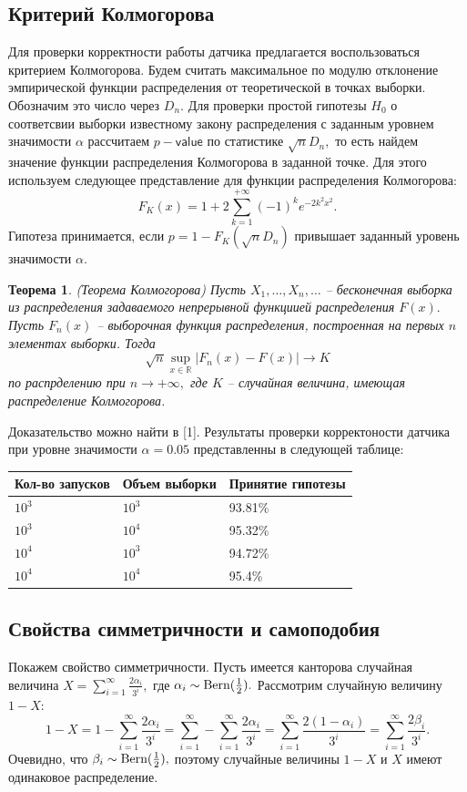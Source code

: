 \documentclass[11pt]{article}
\newtheorem{theorem}{Теорема}
\newcommand{\bern}{\normalfont{\text{Bern}}}
\numberwithin{equation}{section}
\begin{document}
\subsection{Критерий Колмогорова}
Для проверки корректности работы датчика предлагается воспользоваться критерием Колмогорова. Будем считать максимальное по модулю отклонение эмпирической функции распределения от теоретической в точках выборки. 
Обозначим это число через $D_n.$ Для проверки простой гипотезы $H_0$ о соответсвии выборки известному закону распределения с заданным уровнем значимости 
$\alpha$ рассчитаем $p-\textsf{value}$ по статистике $\sqrt{n}D_n,$ то есть найдем значение функции распределения Колмогорова в заданной точке.
Для этого используем следующее представление для функции распределения Колмогорова:
$$ F_K(x)=1+2\sum_{k=1}^{+\infty}(-1)^k e^{-2k^2x^2}.$$
Гипотеза принимается, если $p= 1 -F_K(\sqrt{n}D_n)$ привышает заданный уровень значимости $\alpha$.
\begin{theorem}
  (Теорема Колмогорова)
  Пусть $X_1, \dots, X_n, \dots $ -- бесконечная выборка из распределения задаваемого непрерывной функциией распределения $F(x).$
  Пусть $F_n(x)$ -- выборочная функция распределения, построенная на первых $n$ элементах выборки. Тогда 
  $$ \sqrt{n} \sup_{x\in \mathbb{R}}|F_n(x)-F(x)| \to K$$
  по распрделению при $n \to + \infty,$ где $K$ -- случайная величина, имеющая распределение Колмогорова.
\end{theorem}
Доказательство можно найти в [1]. Результаты проверки корректоности датчика при уровне значимости
$\alpha = 0.05$ представленны в следующей таблице:
\\

\begin{tabular}{ | l | l | l | }
  \hline
  Кол-во запусков & Объем выборки & Принятие гипотезы\\ \hline
  $10^3$ & $10^3$ & 93.81\% \\
  \hline
  $10^3$ & $10^4$ & 95.32\%  \\
  \hline
  $10^4$ & $10^3$ & 94.72\% \\
  \hline
  $10^4$ & $10^4$ & 95.4\% \\
  \hline
\end{tabular}
\subsection{Свойства симметричности и самоподобия}
Покажем свойство симметричности. Пусть имеется канторова случайная величина
$X = \sum_{i=1}^{\infty} \frac{2\alpha_i}{3^i}, $ где $\alpha_i \sim \bern(\frac{1}{2}).$ Рассмотрим случайную величину $1-X$:
$$1-X = 1- \sum_{i=1}^{\infty}\frac{2\alpha_i}{3^i} = \sum_{i=1}^{\infty}-\sum_{i=1}^{\infty}\frac{2\alpha_i}{3^i}=\sum_{i=1}^{\infty}\frac{2(1-\alpha_i)}{3^i} = \sum_{i=1}^{\infty}\frac{2\beta_i}{3^i}.$$
Очевидно, что $\beta_i \sim \bern(\frac{1}{2}),$ поэтому случайные величины $1-X$ и $X$ имеют одинаковое распределение.
\end{document}
